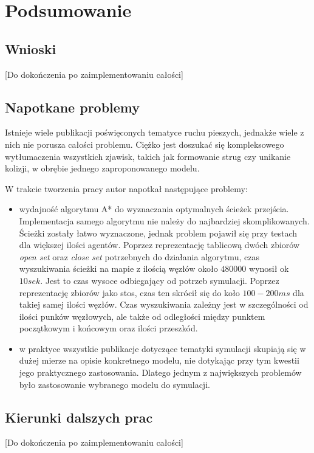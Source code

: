 \chapter{Podsumowanie}
\label{cha:podsumowanie}

\section{Wnioski}
[Do dokończenia po zaimplementowaniu całości]

\section{Napotkane problemy}

Istnieje wiele publikacji poświęconych tematyce ruchu pieszych, jednakże wiele z nich nie porusza całości problemu. Ciężko jest doszukać się kompleksowego wytłumaczenia wszystkich zjawisk, takich jak formowanie strug czy unikanie kolizji, w obrębie jednego zaproponowanego modelu.

W trakcie tworzenia pracy autor napotkał następujące problemy:

\begin{itemize}
\item wydajność algorytmu A* do wyznaczania optymalnych ścieżek przejścia. Implementacja samego algorytmu nie należy do najbardziej skomplikowanych. Ścieżki zostały łatwo wyznaczone, jednak problem pojawił się przy testach dla większej ilości agentów. Poprzez reprezentację tablicową dwóch zbiorów \textit{open set} oraz \textit{close set} potrzebnych do działania algorytmu, czas wyszukiwania ścieżki na mapie z ilością węzłów około $480000$ wynosił ok $10 sek$. Jest to czas wysoce odbiegający od potrzeb symulacji. Poprzez reprezentację zbiorów jako stos, czas ten skrócił się do koło $100-200 ms$ dla takiej samej ilości węzłów. Czas wyszukiwania zależny jest w szczególności od ilości punków węzłowych, ale także od odległości między punktem początkowym i końcowym oraz ilości przeszkód.

\item w praktyce wszystkie publikacje dotyczące tematyki symulacji skupiają się w dużej mierze na opisie konkretnego modelu, nie dotykając przy tym kwestii jego praktycznego zastosowania. Dlatego jednym z największych problemów było zastosowanie wybranego modelu do symulacji.
\end{itemize}

\section{Kierunki dalszych prac}
[Do dokończenia po zaimplementowaniu całości]
